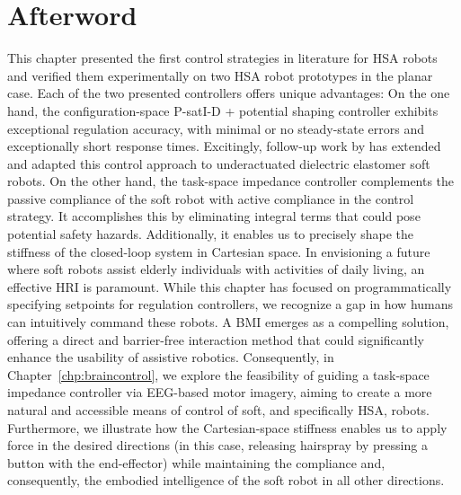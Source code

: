 \newpage






\section*{Afterword}
This chapter presented the first control strategies in literature for \gls{HSA} robots and verified them experimentally on two \gls{HSA} robot prototypes in the planar case.
Each of the two presented controllers offers unique advantages:
On the one hand, the configuration-space P-satI-D + potential shaping controller exhibits exceptional regulation accuracy, with minimal or no steady-state errors and exceptionally short response times.
Excitingly, follow-up work by \citet{soleti2025model} has extended and adapted this control approach to underactuated dielectric elastomer soft robots.
On the other hand, the task-space impedance controller complements the passive compliance of the soft robot with active compliance in the control strategy. It accomplishes this by eliminating integral terms that could pose potential safety hazards. Additionally, it enables us to precisely shape the stiffness of the closed-loop system in Cartesian space.
In envisioning a future where soft robots assist elderly individuals with activities of daily living, an effective \gls{HRI} is paramount. While this chapter has focused on programmatically specifying setpoints for regulation controllers, we recognize a gap in how humans can intuitively command these robots. A \gls{BMI} emerges as a compelling solution, offering a direct and barrier-free interaction method that could significantly enhance the usability of assistive robotics. Consequently, in Chapter~\ref{chp:braincontrol}, we explore the feasibility of guiding a task-space impedance controller via \gls{EEG}-based motor imagery, aiming to create a more natural and accessible means of control of soft, and specifically \gls{HSA}, robots.
Furthermore, we illustrate how the Cartesian-space stiffness enables us to apply force in the desired directions (in this case, releasing hairspray by pressing a button with the end-effector) while maintaining the compliance and, consequently, the embodied intelligence of the soft robot in all other directions.